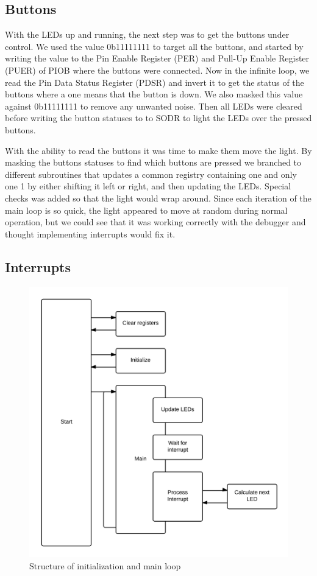 \subsection{Buttons}

With the LEDs up and running, the next step was to get the buttons under control. We used the value 0b11111111 to target all the buttons, and started by writing the value to the Pin Enable Register (PER) and Pull-Up Enable Register (PUER) of PIOB where the buttons were connected. Now in the infinite loop, we read the Pin Data Status Register (PDSR) and invert it to get the status of the buttons where a one means that the button is down. We also masked this value against 0b11111111 to remove any unwanted noise. Then all LEDs were cleared before writing the button statuses to to SODR to light the LEDs over the pressed buttons.

With the ability to read the buttons it was time to make them move the light. By masking the buttons statuses to find which buttons are pressed we branched to different subroutines that updates a common registry containing one and only one 1 by either shifting it left or right, and then updating the LEDs. Special checks was added so that the light would wrap around. Since each iteration of the main loop is so quick, the light appeared to move at random during normal operation, but we could see that it was working correctly with the debugger and thought implementing interrupts would fix it.
\subsection{Interrupts}

\begin{figure}
  \centering
    \includegraphics[width=0.4\textheight]{mainstructure}
 \caption{Structure of initialization and main loop}
 \label{mainstruct}
\end{figure}

